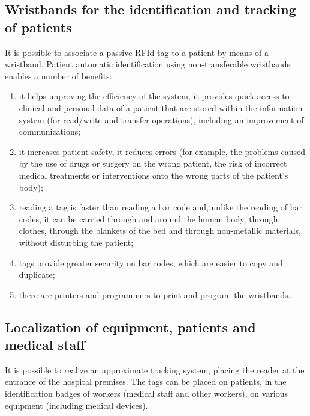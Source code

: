 \subsection[Wristbands for the identification and tracking of patients]{Wristbands for the identification and tracking of patients} 
It is possible to associate a passive RFId tag to a patient by means of a wristband. Patient automatic identification using non-transferable wristbands enables a number of benefits: 


\begin{enumerate}
	\item it helps improving the efficiency of the system, it provides quick access to clinical and personal data of a patient that are stored within the information system (for read/write and transfer operations), including an improvement of communications; 
	\item it increases patient safety, it reduces errors (for example, the problems caused by the use of drugs or surgery on the wrong patient, the risk of incorrect medical treatments or interventions onto the wrong parts of the patient’s body); 
	\item reading a tag is faster than reading a bar code and, unlike the reading of bar codes, it can be carried through and around the human body, through clothes, through the blankets of the bed and through non-metallic materials, without disturbing the patient;
	\item tags provide greater security on bar codes, which are easier to copy and duplicate; 
	\item there are printers and programmers to print and program the wristbands.
\end{enumerate}

\subsection[Localization of equipment, patients and medical staff]{Localization of equipment, patients and medical staff} 
It is possible to realize an approximate tracking system, placing the reader at the entrance of the hospital premises. The tags can be placed on patients, in the identification badges of workers (medical staff and other workers), on various equipment (including medical devices). 

